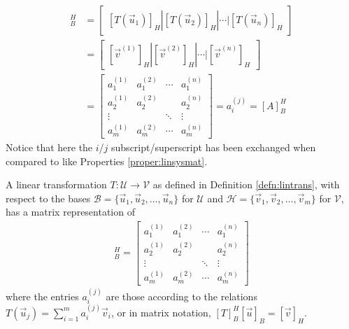 \begin{align*}
[T]_B^H &= 
\begin{bmatrix}
[T(\vec{u}_1)]_H | [T(\vec{u}_2)]_H | \cdots | [T(\vec{u}_n)]_H
\end{bmatrix} \\
&=
\begin{bmatrix}
[\vec{v}^{(1)}]_H | [\vec{v}^{(2)}]_H | \cdots | [\vec{v}^{(n)}]_H
\end{bmatrix} \\
&= 
\begin{bmatrix}
a_1^{(1)} & a_1^{(2)} & \cdots & a_1^{(n)} \\
a_2^{(1)} & a_2^{(2)} &  & a_2^{(n)} \\
\vdots & & \ddots & \vdots \\
a_m^{(1)} & a_m^{(2)} & \cdots & a_m^{(n)}
\end{bmatrix}
= a_i^{(j)} = [A]_B^H
\end{align*}
Notice that here the $i$/$j$ subscript/superscript has been exchanged when compared to like Properties \ref{proper:linsysmat}.
\begin{defn}
\label{defn:matrixrepoflintrans}
A linear transformation $T: \mathcal{U} \to \mathcal{V}$ as defined in Definition \ref{defn:lintrans}, with respect to the bases $\mathcal{B} = \{\vec{u}_1, \vec{u}_2, \ldots, \vec{u}_n\}$ for $\mathcal{U}$ and $\mathcal{H} = \{\vec{v}_1, \vec{v}_2, \ldots, \vec{v}_m\}$ for $\mathcal{V}$, has a matrix representation of
\begin{align*}
[T]_B^H = 
\begin{bmatrix}
a_1^{(1)} & a_1^{(2)} & \cdots & a_1^{(n)} \\
a_2^{(1)} & a_2^{(2)} &  & a_2^{(n)} \\
\vdots & & \ddots & \vdots \\
a_m^{(1)} & a_m^{(2)} & \cdots & a_m^{(n)}
\end{bmatrix}
\end{align*}
where the entries $a_i^{(j)}$ are those according to the relations $T(\vec{u}_j) = \sum_{i=1}^{m} a_i^{(j)}\vec{v}_i$, or in matrix notation, $[T]_B^H [\vec{u}]_B = [\vec{v}]_H$.
\end{defn}

